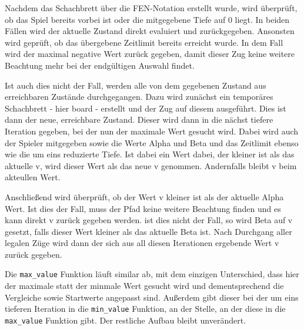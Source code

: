 Nachdem das Schachbrett über die FEN-Notation erstellt wurde, wird
überprüft, ob das Spiel bereits vorbei ist oder die mitgegebene Tiefe
auf 0 liegt. In beiden Fällen wird der aktuelle Zustand direkt evaluiert
und zurückgegeben. Ansonsten wird geprüft, ob das übergebene Zeitlimit
bereits erreicht wurde. In dem Fall wird der maximal negative Wert
zurück gegeben, damit dieser Zug keine weitere Beachtung mehr bei der
endgültigen Auswahl findet.

Ist auch dies nicht der Fall, werden alle von dem gegebenen Zustand aus
erreichbaren Zustände durchgegangen. Dazu wird zunächst ein temporäres
Schachbrett - hier board - erstellt und der Zug auf diesem ausgeführt.
Dies ist dann der neue, erreichbare Zustand. Dieser wird dann in die
nächst tiefere Iteration gegeben, bei der nun der maximale Wert gesucht
wird. Dabei wird auch der Spieler mitgegeben sowie die Werte Alpha und
Beta und das Zeitlimit ebenso wie die um eins reduzierte Tiefe. Ist
dabei ein Wert dabei, der kleiner ist als das aktuelle v, wird dieser
Wert als das neue v genommen. Andernfalls bleibt v beim akteullen Wert.

Anschließend wird überprüft, ob der Wert v kleiner ist als der aktuelle
Alpha Wert. Ist dies der Fall, muss der Pfad keine weitere Beachtung
finden und es kann direkt v zurück gegeben werden. ist dies nicht der
Fall, so wird Beta auf v gesetzt, falls dieser Wert kleiner als das
aktuelle Beta ist. Nach Durchgang aller legalen Züge wird dann der sich
aus all diesen Iterationen ergebende Wert v zurück gegeben.

Die \texttt{max\_value} Funktion läuft similar ab, mit dem einzigen
Unterschied, dass hier der maximale statt der minmale Wert gesucht wird
und dementsprechend die Vergleiche sowie Startwerte angepasst sind.
Außerdem gibt dieser bei der um eins tieferen Iteration in die
\texttt{min\_value} Funktion, an der Stelle, an der diese in die
\texttt{max\_value} Funktion gibt. Der restliche Aufbau bleibt
unverändert.

